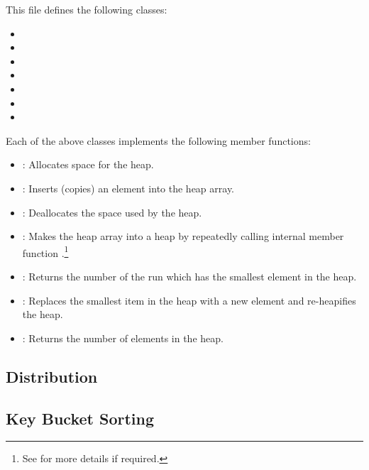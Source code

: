This file defines the following classes:
\begin{itemize}
    \item {}
    \item {}
    \item {}
    \item {}
    \item {}
    \item {}
    \item {}
\end{itemize}

Each of the above classes implements the following member
functions:
\begin{itemize}
    \item {}: Allocates space for the heap.
    \item {}: Inserts (copies) an element into
    the heap array.
    \item {}: Deallocates the space used by the heap.
    \item {}: Makes the heap array into a heap
    by repeatedly calling internal member function
    .\footnote{%
       See \cite{cormen:introduction} for more details if
       required.}
    \item {}: Returns the number of the
    run which has the smallest element in the heap.
    \item {}: Replaces the
    smallest item in the heap with a new element  and
    re-heapifies the heap.
    \item {}: Returns the number of elements
    in the heap.
\end{itemize}




\subsection{Distribution}

\tobewritten


\subsection{Key Bucket Sorting}

